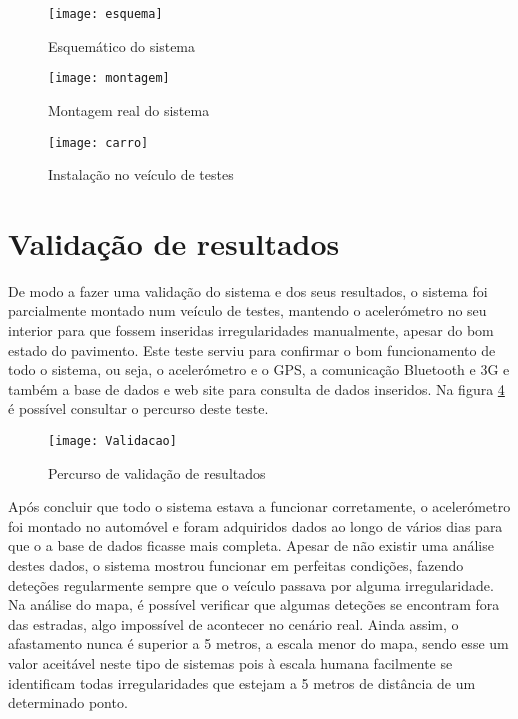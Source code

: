 \begin{figure}[htbp]
	\centering
	\texttt{[image: esquema]}
	\caption{Esquemático do sistema}
	\label{fig:esquematico_do_sistema}
\end{figure}

\begin{figure}[htbp]
	\centering
	\texttt{[image: montagem]}
	\caption{Montagem real do sistema}
	\label{fig:montagem_real_do_sistema}
\end{figure}

\begin{figure}[htbp]
	\centering
	\texttt{[image: carro]}
	\caption{Instalação no veículo de testes}
	\label{fig:carro}
\end{figure}

\section{Validação de resultados}
\label{sec:validacao}

De modo a fazer uma validação do sistema e dos seus resultados, o sistema foi parcialmente montado num veículo de testes, mantendo o acelerómetro no seu interior para que fossem inseridas irregularidades manualmente, apesar do bom estado do pavimento.
Este teste serviu para confirmar o bom funcionamento de todo o sistema, ou seja, o acelerómetro e o GPS, a comunicação Bluetooth e 3G e também a base de dados e web site para consulta de dados inseridos.
Na figura \ref{fig:validacao} é possível consultar o percurso deste teste.

\begin{figure}[htbp]
	\centering
	\texttt{[image: Validacao]}
	\caption{Percurso de validação de resultados}
	\label{fig:validacao}
\end{figure}

Após concluir que todo o sistema estava a funcionar corretamente, o acelerómetro foi montado no automóvel e foram adquiridos dados ao longo de vários dias para que o a base de dados ficasse mais completa.
Apesar de não existir uma análise destes dados, o sistema mostrou funcionar em perfeitas condições, fazendo deteções regularmente sempre que o veículo passava por alguma irregularidade.
Na análise do mapa, é possível verificar que algumas deteções se encontram fora das estradas, algo impossível de acontecer no cenário real.
Ainda assim, o afastamento nunca é superior a 5 metros, a escala menor do mapa, sendo esse um valor aceitável neste tipo de sistemas pois à escala humana facilmente se identificam todas irregularidades que estejam a 5 metros de distância de um determinado ponto.

